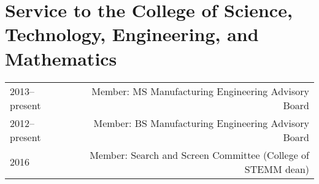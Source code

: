 \section*{Service to the College of Science, Technology, Engineering, and Mathematics}
\begin{tabular}{L!{\VRule}R}
2013--present&Member: MS Manufacturing Engineering Advisory Board\\
2012--present&Member: BS Manufacturing Engineering Advisory Board\\
2016&Member: Search and Screen Committee (College of STEMM dean)\\
\end{tabular}